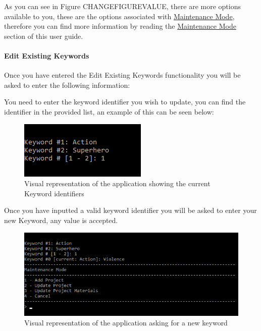 \documentclass[
  english,
  a4paper,
,tablecaptionabove
]{scrartcl}
\begin{document}
As you can see in Figure CHANGEFIGUREVALUE, there are more options
available to you, these are the options associated with
\protect\hyperlink{using-maintenance-mode}{Maintenance Mode}, therefore
you can find more information by reading the
\protect\hyperlink{using-maintenance-mode}{Maintenance Mode} section of
this user guide.

\newpage

\hypertarget{edit-existing-keywords}{%
\paragraph{Edit Existing Keywords}\label{edit-existing-keywords}}

Once you have entered the Edit Existing Keywords functionality you will
be asked to enter the following information:

You need to enter the keyword identifier you wish to update, you can
find the identifier in the provided list, an example of this can be seen
below:

\begin{figure}
\centering
\includegraphics{images/user-guide/maintenance-mode/update-project-select-keyword.png}
\caption{Visual representation of the application showing the current
Keyword identifiers}
\end{figure}

Once you have inputted a valid keyword identifier you will be asked to
enter your new Keyword, any value is accepted.

\begin{figure}
\centering
\includegraphics{images/user-guide/maintenance-mode/update-project-keyword.png}
\caption{Visual representation of the application asking for a new
keyword}
\end{figure}
\end{document}
